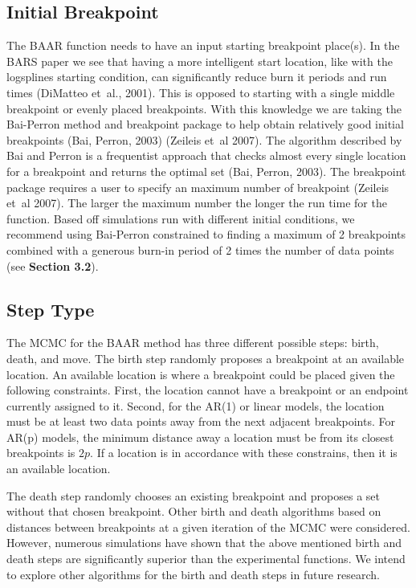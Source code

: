 \documentclass[submit]{smj}
\begin{document}
\subsection{Initial Breakpoint}
The BAAR function needs to have an input starting breakpoint place(s). In the BARS paper we see that having a more intelligent start location, like with the logsplines starting condition, can significantly reduce burn it periods and run times (DiMatteo et~al., 2001). This is opposed to starting with a single middle breakpoint or evenly placed breakpoints. With this knowledge we are taking the Bai-Perron method and breakpoint package to help obtain relatively good initial breakpoints (Bai, Perron, 2003) (Zeileis et~al 2007). The algorithm described by Bai and Perron is a frequentist approach that checks almost every single location for a breakpoint and returns the optimal set (Bai, Perron, 2003). The breakpoint package requires a user to specify an maximum number of breakpoint (Zeileis et~al 2007). The larger the maximum number the longer the run time for the function. Based off simulations run with different initial conditions, we recommend using Bai-Perron constrained to finding a maximum of 2 breakpoints combined with a generous burn-in period of 2 times the number of data points (see \textbf{Section 3.2}).

\subsection{Step Type}
The MCMC for the BAAR method has three different possible steps: birth, death, and move. The birth step randomly proposes a breakpoint at an available location. An available location is where a breakpoint could be placed given the following constraints. First, the location cannot have a breakpoint or an endpoint currently assigned to it. Second, for the AR(1) or linear models, the location must be at least two data points away from the next adjacent breakpoints. For AR(p) models, the minimum distance away a location must be from its closest breakpoints is $2p$. If a location is in accordance with these constrains, then it is an available location.  

The death step randomly chooses an existing breakpoint and proposes a set without that chosen breakpoint. 
Other birth and death algorithms based on distances between breakpoints at a given iteration of the MCMC were considered. However, numerous simulations have shown that the above mentioned birth and death steps are significantly superior than the experimental functions. We intend to explore other algorithms for the birth and death steps in future research. 
  
\end{document}

